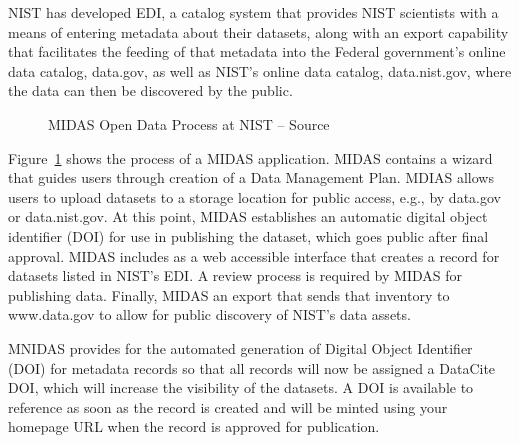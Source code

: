 NIST has developed EDI, a catalog system that provides NIST scientists with a means of entering metadata about their datasets, along with an export capability that facilitates the feeding of that metadata into the Federal government’s online data catalog, data.gov, as well as NIST’s online data catalog, data.nist.gov, where the data can then be discovered by the public.
\begin{figure}[!h]
\centering
{}
\caption{MIDAS Open Data Process at NIST -- Source~\cite{MIDASHELP}}
\label{fg:midas_arch} 
\end{figure}

Figure~\ref{fg:midas_arch}  shows the process of a MIDAS application. MIDAS contains a wizard that guides users through creation of a Data Management Plan. MDIAS allows users to upload datasets to a  storage location for public access, e.g., by data.gov or data.nist.gov.  At this point, MIDAS establishes an automatic digital object identifier (DOI) for use in publishing the dataset, which goes public after  final approval.  MIDAS includes as a web accessible interface that creates a record for datasets listed in NIST’s EDI.  A review process is required by MIDAS for publishing data.  
Finally, MIDAS an export that sends that inventory to www.data.gov to allow for public discovery of NIST’s data assets.



MNIDAS provides for the automated generation of Digital Object Identifier (DOI) for metadata records so  that all records will now be assigned a DataCite DOI, which will increase the visibility of the datasets.  A DOI is available to reference as soon as the record is created and will be minted using your homepage URL when the record is approved for publication.









